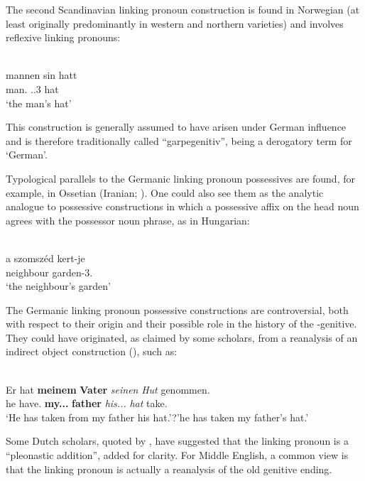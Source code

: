 The second Scandinavian linking pronoun construction is found in Norwegian (at least originally predominantly in western and northern varieties) and involves reflexive linking pronouns:

\ea%
\\
\gll mannen  sin  hatt\\
man.{}  {\poss}.{}.3{\sg}  hat\\
\glt ‘the man’s hat’
\z

This construction is generally assumed to have arisen under German influence and is therefore traditionally called “garpegenitiv”,  being a derogatory term for ‘German’.

Typological parallels to the Germanic linking pronoun possessives are found, for example, in Ossetian (Iranian; \citealt[669]{KoptjevskajaTamm2003}). One could also see them as the analytic analogue to possessive constructions in which a possessive affix on the head noun agrees with the possessor noun phrase, as in Hungarian:

\ea%
\\
\gll a  szomszéd  kert-je\\
{}  neighbour  garden-3{\sg}.{\poss}\\
\glt ‘the neighbour’s garden’ \citep[648]{KoptjevskajaTamm2003} 
\z

The Germanic linking pronoun possessive constructions are controversial, both with respect to their origin and their possible role in the history of the -genitive. They could have originated, as claimed by some scholars, from a reanalysis of an indirect object construction (\citealt[638]{Behaghel1923}), such as:

\ea%
\\
\gll Er  hat  \textbf{meinem} \textbf{Vater} \textit{seinen}\textit{  Hut}\textit{  }genommen.\\
he  have.{\prs}  \textbf{my.{\dat}.{\m}.{\sg}} \textbf{father} \textit{his.{\acc}.{\m}.{\sg}}\textit{  }\textit{hat}\textit{  }take.{\pp}\\
\glt ‘He has taken from my father his hat.’?’he has taken my father’s hat.’
\z

Some Dutch scholars, quoted by \citet[58]{Norde1997}, have suggested that the linking pronoun is a “pleonastic addition”, added for clarity. For Middle English, a common view is that the linking pronoun  is actually a reanalysis of the old genitive ending.

